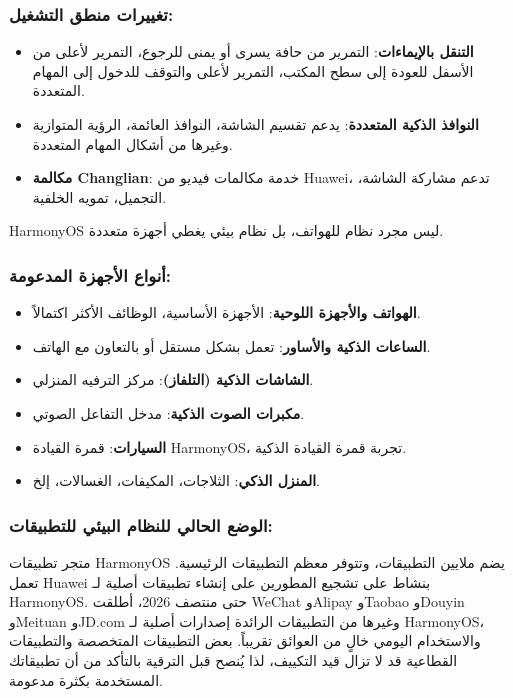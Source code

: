 \subsubsection*{تغييرات منطق التشغيل:}

\begin{itemize}
  \item \textbf{التنقل بالإيماءات}: التمرير من حافة يسرى أو يمنى للرجوع، التمرير لأعلى من الأسفل للعودة إلى سطح المكتب، التمرير لأعلى والتوقف للدخول إلى المهام المتعددة.
  \item \textbf{النوافذ الذكية المتعددة}: يدعم تقسيم الشاشة، النوافذ العائمة، الرؤية المتوازية وغيرها من أشكال المهام المتعددة.
  \item \textbf{مكالمة Changlian}: خدمة مكالمات فيديو من Huawei، تدعم مشاركة الشاشة، التجميل، تمويه الخلفية.
\end{itemize}


HarmonyOS ليس مجرد نظام للهواتف، بل نظام بيئي يغطي أجهزة متعددة.

\subsubsection*{أنواع الأجهزة المدعومة:}

\begin{itemize}
  \item \textbf{الهواتف والأجهزة اللوحية}: الأجهزة الأساسية، الوظائف الأكثر اكتمالاً.
  \item \textbf{الساعات الذكية والأساور}: تعمل بشكل مستقل أو بالتعاون مع الهاتف.
  \item \textbf{الشاشات الذكية (التلفاز)}: مركز الترفيه المنزلي.
  \item \textbf{مكبرات الصوت الذكية}: مدخل التفاعل الصوتي.
  \item \textbf{السيارات}: قمرة القيادة HarmonyOS، تجربة قمرة القيادة الذكية.
  \item \textbf{المنزل الذكي}: الثلاجات، المكيفات، الغسالات، إلخ.
\end{itemize}

\subsubsection*{الوضع الحالي للنظام البيئي للتطبيقات:}

متجر تطبيقات HarmonyOS يضم ملايين التطبيقات، وتتوفر معظم التطبيقات الرئيسية. تعمل Huawei بنشاط على تشجيع المطورين على إنشاء تطبيقات أصلية لـ HarmonyOS. حتى منتصف 2026، أطلقت WeChat وAlipay وTaobao وDouyin وMeituan وJD.com وغيرها من التطبيقات الرائدة إصدارات أصلية لـ HarmonyOS، والاستخدام اليومي خالٍ من العوائق تقريباً. بعض التطبيقات المتخصصة والتطبيقات القطاعية قد لا تزال قيد التكييف، لذا يُنصح قبل الترقية بالتأكد من أن تطبيقاتك المستخدمة بكثرة مدعومة.

